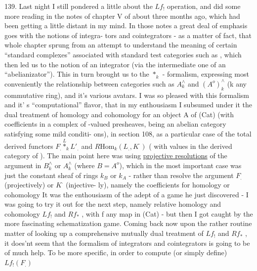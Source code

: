 139. Last night I still pondered a little about the $Lf_{!}$ operation,
and did some more reading in the notes of chapter V of about three
months ago, which had been getting a little distant in my mind. In
those notes a great deal of emphasis goes with the notions of integra-%
tors and cointegrators - as a matter of fact,  that whole
chapter sprung from an attempt to understand the meaning  of
certain ``standard complexes'' associated with standard test categories
such as \hand{$\Delta$}, which then led us to the notion of an integrator (via the
intermediate one of an ``abelianizator''). This in turn brought us to
the $*_{k}$ - formalism, expressing most conveniently the relationship
between categories such as $A^{\wedge}_{k}$ and $(A^{o})^{\wedge}_{k}$ (k any commutative ring),
and it's various avatars. I was so pleased with this formalism and it'
s ``computational'' flavor, that in my enthousiasm I subsumed under it
the dual treatment of homology and cohomology for an
object A of (Cat) (with coefficients in a complex of -valued
presheaves, being an abelian category satisfying some mild conditi-%
ons), in section 108, as a particular case of the total derived
functors $F_{.}\overset{L}{*}_{k}L'_{.}$ and $R\mathrm{Hom}_{k}(L_{.},K^{\cdot})$ ( with values in the derived
category of  ). The main point here was using \uline{projective resolutions}
of the argument  in $B^{\wedge}_{k}$ or $A^{\wedge}_{k}$ (where $B=A^{o}$), which in 
the most important case was just the constant sheaf of rings $k_{B}$ or $k_{A}$
- rather than resolve the argument $F_{.}$ (projectively) or $K^{\cdot}$ (injective-%
ly), namely the coefficients for homology or cohomology
It was the enthousiasm of the adept of a game he just discovered -
I was going to try it out for the next step, namely relative homology
and cohomology $Lf_{!}$ and $Rf_{*}$ , with f any map in (Cat)\deleted{,} - but then I
got caught by the more fascinating schematization game. Coming back
now upon the rather routine matter of looking up a comprehensive
mutually dual treatment of $Lf_{!}$ and $Rf_{*}$ , it does'nt seem that the
formalism of integrators and cointegrators is going to be of much help.
To be more specific, in order to compute (or simply define) $Lf_{!}(F_{.})$

